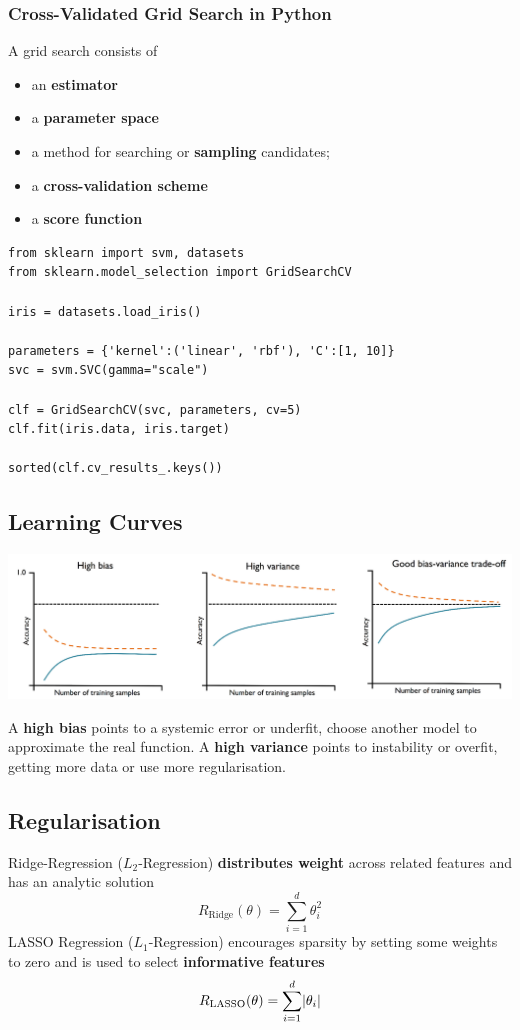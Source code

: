 \documentclass[11pt]{article}
\theoremstyle{definition}
\DeclarePairedDelimiter\abs{\lvert}{\rvert}
\begin{document}
\subsubsection{Cross-Validated Grid Search in Python}
A grid search consists of
\begin{itemize}[nosep,noitemsep]
	\item an \textbf{estimator}
	\item a \textbf{parameter space}
	\item a method for searching or \textbf{sampling} candidates;
	\item a \textbf{cross-validation scheme}
	\item a \textbf{score function}
\end{itemize}
\begin{verbatim}
from sklearn import svm, datasets
from sklearn.model_selection import GridSearchCV

iris = datasets.load_iris()

parameters = {'kernel':('linear', 'rbf'), 'C':[1, 10]}
svc = svm.SVC(gamma="scale")

clf = GridSearchCV(svc, parameters, cv=5)
clf.fit(iris.data, iris.target)

sorted(clf.cv_results_.keys())
\end{verbatim}

\subsection{Learning Curves}
\begin{center}
	\includegraphics[width=0.9\linewidth]{img/learning_curve_bias_variance}
\end{center}
A \textbf{high bias} points to a systemic error or underfit, choose another model to approximate the real function. A \textbf{high variance} points to instability or overfit, getting more data or use more regularisation.
\subsection{Regularisation}
Ridge-Regression ($L_2$-Regression) \textbf{distributes weight} across related features and has an analytic solution
\begin{equation*}
	R_{\text{Ridge}}(\theta) = \sum_{i=1}^{d} \theta_i^2
\end{equation*}
LASSO Regression ($L_1$-Regression) encourages sparsity by setting some weights to zero and is used to select \textbf{informative features}
\begin{equation*}
	R_{\text{LASSO}}(\theta) = \sum_{i=1}^d\abs{\theta_i}
\end{equation*}
\end{document}
